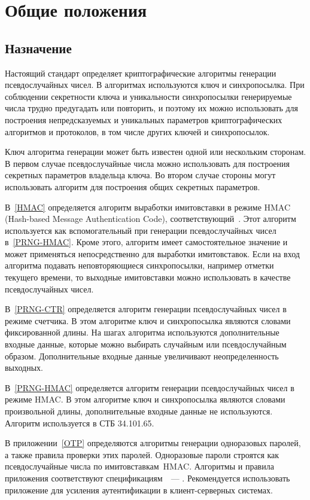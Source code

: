 \chapter{Общие положения}\label{COMMON}

\section{Назначение}\label{COMMON.Dest}

Настоящий стандарт определяет криптографические алгоритмы
генерации псевдослучайных чисел.
%
В алгоритмах используются ключ и синхропосылка.
%
При соблюдении секретности ключа и уникальности синхропосылки
генерируемые числа трудно предугадать или повторить,
и поэтому их можно использовать для построения непредсказуемых
и уникальных параметров криптографических алгоритмов и протоколов, 
в том числе других ключей и синхропосылок.

Ключ алгоритма генерации может быть известен одной или нескольким сторонам.
В первом случае псевдослучайные числа можно использовать для построения 
секретных параметров владельца ключа. 
Во втором случае стороны могут использовать алгоритм 
для построения общих секретных параметров.

В~\ref{HMAC} определяется алгоритм выработки имитовставки в режиме HMAC
(Hash-based Message Authentication Code),
соответствующий~\cite{RFC-HMAC}.
%
Этот алгоритм используется как вспомогательный
при генерации псевдослучайных чисел в~\ref{PRNG-HMAC}.
%
Кроме этого, алгоритм имеет самостоятельное 
значение и может применяться непосредственно для 
выработки имитовставок. 
%
Если на вход алгоритма подавать неповторяющиеся 
синхропосылки, например отметки текущего времени,
то выходные имитовставки можно использовать в качестве 
псевдослучайных чисел.

В~\ref{PRNG-CTR} определяется алгоритм генерации псевдослучайных чисел 
в режиме счетчика. В этом алгоритме ключ и синхропосылка являются 
словами фиксированной длины. На шагах алгоритма используются дополнительные 
входные данные, которые можно выбирать случайным или псевдослучайным 
образом. 
Дополнительные входные данные увеличивают неопределенность выходных. 

В~\ref{PRNG-HMAC} определяется алгоритм генерации псевдослучайных чисел 
в режиме HMAC. В этом алгоритме ключ и синхропосылка являются словами 
произвольной длины, дополнительные входные данные не используются.
Алгоритм используется в СТБ 34.101.65.

В приложении~\ref{OTP} определяются алгоритмы генерации 
одноразовых паролей, а также правила проверки этих паролей. 
%
Одноразовые пароли строятся как псевдослучайные числа по 
имитовставкам~HMAC.  
%
Алгоритмы и правила приложения
соответствуют спецификациям~\cite{HOTP}~--- \cite{OCRA}. 
%
Рекомендуется использовать приложение для усиления 
аутентификации в клиент-серверных системах.

